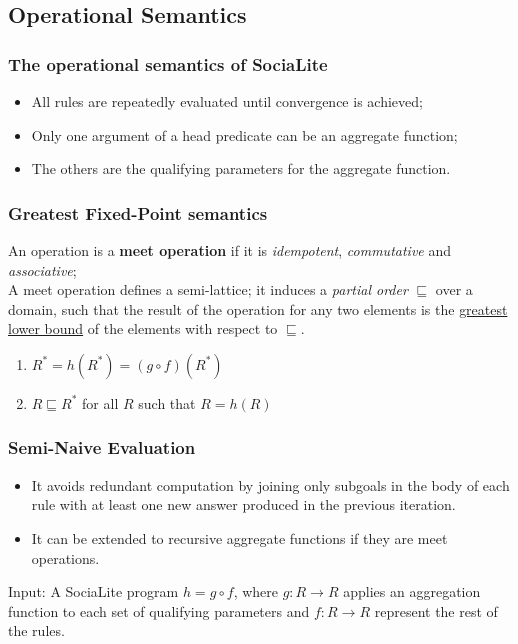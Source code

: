 \documentclass{beamer}
\begin{document}
\subsection{Operational Semantics}
\frame
{
	\frametitle{The operational semantics of SociaLite}

	\begin{itemize}
		\item All rules are repeatedly evaluated until convergence is achieved;
		\item Only one argument of a head predicate can be an aggregate function;
		\item The others are the qualifying parameters for the aggregate function.
	\end{itemize}
	
}

\frame
{
	\frametitle{Greatest Fixed-Point semantics}

	\begin{block}{}
		An operation is a \textbf{meet operation} if it is \textit{idempotent}, \textit{commutative} and \textit{associative}; \\
		A meet operation defines a semi-lattice; it induces a \textit{partial order} $\sqsubseteq$ over a domain, such that the result of the operation for any two elements is the \underline{greatest lower bound} of the elements with respect to $\sqsubseteq$.
	\end{block}
	
	\begin{enumerate}
		\item $R^{\ast} = h(R^{\ast})=(g\circ f)(R^{\ast})$
		\item $R \sqsubseteq R^{\ast}$ for all $R$ such that $R = h(R)$
	\end{enumerate}
	
}

\frame
{
	\frametitle{Semi-Naive Evaluation}
	
	\begin{itemize}
		\item It avoids redundant computation by joining only subgoals in the body of each rule with at least one new answer produced in the previous iteration.
		\item It can be extended to recursive aggregate functions if they are meet operations.	
	\end{itemize}
	
	Input: A SociaLite program $h = g\circ f$, where $g: R\rightarrow R$ applies an aggregation function to each set of qualifying parameters and $f : R \rightarrow R$ represent the rest of the rules.
}
\end{document}
